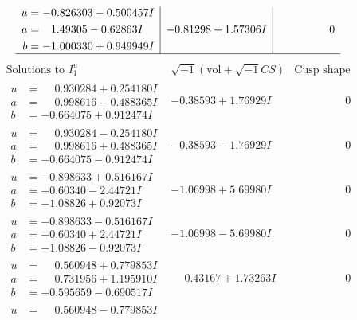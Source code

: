 \documentclass[1p]{elsarticle_modified}
\theoremstyle{definition}
\newcommand{\I}{\sqrt{-1}}
\begin{document}
$$\begin{array}{c|c|c}
\begin{aligned}
u &= -0.826303 - 0.500457 I \\
a &= \phantom{-}1.49305 - 0.62863 I \\
b &= -1.000330 + 0.949949 I\end{aligned}
 & -0.81298 + 1.57306 I & \phantom{-0.000000 } 0\\
 \hline 
 \end{array}$$\newpage$$\begin{array}{c|c|c}  
\text{Solutions to }I^u_{1}& \I (\text{vol} + \sqrt{-1}CS) & \text{Cusp shape}\\
 \hline 
\begin{aligned}
u &= \phantom{-}0.930284 + 0.254180 I \\
a &= \phantom{-}0.998616 - 0.488365 I \\
b &= -0.664075 + 0.912474 I\end{aligned}
 & -0.38593 + 1.76929 I & \phantom{-0.000000 } 0 \\ \hline\begin{aligned}
u &= \phantom{-}0.930284 - 0.254180 I \\
a &= \phantom{-}0.998616 + 0.488365 I \\
b &= -0.664075 - 0.912474 I\end{aligned}
 & -0.38593 - 1.76929 I & \phantom{-0.000000 } 0 \\ \hline\begin{aligned}
u &= -0.898633 + 0.516167 I \\
a &= -0.60340 - 2.44721 I \\
b &= -1.08826 + 0.92073 I\end{aligned}
 & -1.06998 + 5.69980 I & \phantom{-0.000000 } 0 \\ \hline\begin{aligned}
u &= -0.898633 - 0.516167 I \\
a &= -0.60340 + 2.44721 I \\
b &= -1.08826 - 0.92073 I\end{aligned}
 & -1.06998 - 5.69980 I & \phantom{-0.000000 } 0 \\ \hline\begin{aligned}
u &= \phantom{-}0.560948 + 0.779853 I \\
a &= \phantom{-}0.731956 + 1.195910 I \\
b &= -0.595659 - 0.690517 I\end{aligned}
 & \phantom{-}0.43167 + 1.73263 I & \phantom{-0.000000 } 0 \\ \hline\begin{aligned}
u &= \phantom{-}0.560948 - 0.779853 I \\

\end{aligned}
\end{array}$$
\end{document}
